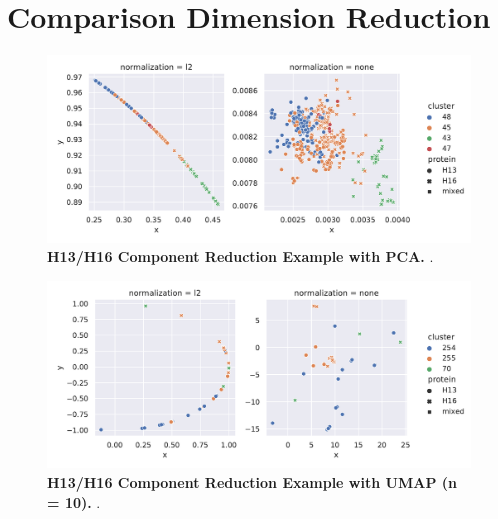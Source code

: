 \section{Comparison Dimension Reduction} \label{sec:Comparison_Dimension_Reduction}

\blindtext

\begin{figure}[!hbt]
    \includegraphics[width=\dimexpr\textwidth-2\fboxsep-2\fboxrule,fbox]{PCA/Difference_Segment_4_H_PCA.pdf}
    \caption[H13/H16 Component Reduction Example with \Acrshort{PCA}]{\textbf{H13/H16 Component Reduction Example with \Acrshort{PCA}.} .}
    \label{fig:Reduction_Example_PCA}
\end{figure}

\begin{figure}[!hbt]
    \includegraphics[width=\dimexpr\textwidth-2\fboxsep-2\fboxrule,fbox]{UMAP/Difference_Segment_4_H_UMAP_Neighbors_10.pdf}
    \caption[H13/H16 Component Reduction Example with \Acrshort{UMAP} (n = 10)]{\textbf{H13/H16 Component Reduction Example with \Acrshort{UMAP} (n = 10).} .}
    \label{fig:Reduction_Example_UMAP_10}
\end{figure}

